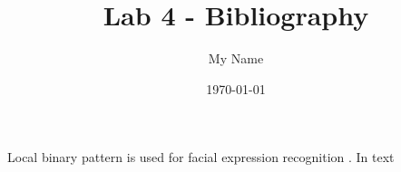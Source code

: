 \documentclass[a4paper, 12pt]{article}
\title{Lab 4 - Bibliography}
\author{My Name}
\date{\today}
\begin{document}
\maketitle

Local binary pattern is used for facial expression recognition \cite{shan2009facial, cohen2003facial}. In text \cite{9039580, SHAN2009803}



\end{document}
